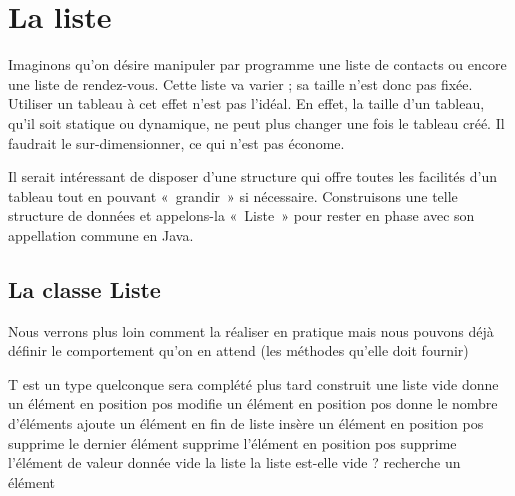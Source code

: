 \chapter{La liste}


Imaginons qu’on désire manipuler par programme une liste de contacts ou
encore une liste de rendez-vous. Cette liste va varier ; sa taille
n’est donc pas fixée. Utiliser un tableau à cet effet n’est pas
l’idéal. En effet, la taille d’un tableau, qu’il soit statique ou
dynamique, ne peut plus changer une fois le tableau créé. Il faudrait
le sur-dimensionner, ce qui n’est pas économe.

Il serait intéressant de disposer d’une structure qui offre toutes les
facilités d’un tableau tout en pouvant «~grandir~» si nécessaire.
Construisons une telle structure de données et appelons-la «~Liste~»
pour rester en phase avec son appellation commune en Java.

\section{La classe Liste}

Nous verrons plus loin comment la réaliser en pratique mais nous pouvons
déjà définir le comportement qu’on en attend (les méthodes qu’elle doit
fournir)

\begin{Pseudocode}
		\RComment T est un type quelconque
		\Private
			\LComment sera complété plus tard	
		\Public
				\RComment construit une liste vide
				\RComment donne un élément en position pos
				\RComment modifie un élément en position pos
				\RComment donne le nombre d’éléments
				\RComment ajoute un élément en fin de liste
				\RComment insère un élément en position pos
				\RComment supprime le dernier élément
				\RComment supprime l'élément en position pos
				\RComment supprime l'élément de valeur donnée
				\RComment vide la liste
				\RComment la liste est-elle vide ?
				\RComment recherche un élément
		\EndClass
\end{Pseudocode}

